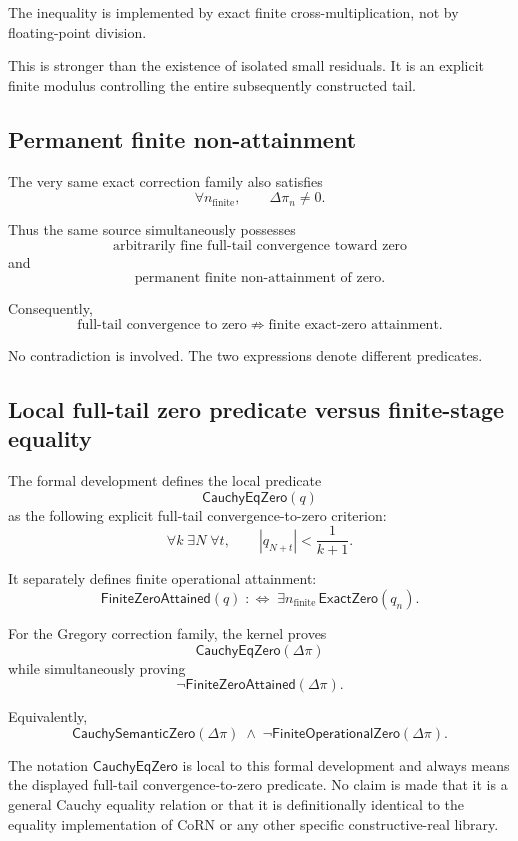\documentclass[11pt,a4paper]{article}
\begin{document}
The inequality is implemented by exact finite cross-multiplication,
not by floating-point division.

This is stronger than the existence of isolated small residuals.  It
is an explicit finite modulus controlling the entire subsequently
constructed tail.

\subsection{Permanent finite non-attainment}

The very same exact correction family also satisfies
\[
\boxed{
\forall n_{\mathrm{finite}},
\qquad
\Delta\pi_n\neq0.
}
\]

Thus the same source simultaneously possesses
\[
\text{arbitrarily fine full-tail convergence toward zero}
\]
and
\[
\text{permanent finite non-attainment of zero}.
\]

Consequently,
\[
\boxed{
\text{full-tail convergence to zero}
\not\Rightarrow
\text{finite exact-zero attainment}.
}
\]

No contradiction is involved.  The two expressions denote different
predicates.

\subsection{Local full-tail zero predicate versus finite-stage equality}

The formal development defines the local predicate
\[
\mathsf{CauchyEqZero}(q)
\]
as the following explicit full-tail convergence-to-zero criterion:
\[
\forall k\;
\exists N\;
\forall t,\qquad
|q_{N+t}|<\frac{1}{k+1}.
\]

It separately defines finite operational attainment:
\[
\mathsf{FiniteZeroAttained}(q)
\;:\Longleftrightarrow\;
\exists n_{\mathrm{finite}}\,
\mathsf{ExactZero}(q_n).
\]

For the Gregory correction family, the kernel proves
\[
\mathsf{CauchyEqZero}(\Delta\pi)
\]
while simultaneously proving
\[
\neg\mathsf{FiniteZeroAttained}(\Delta\pi).
\]

Equivalently,
\[
\boxed{
\mathsf{CauchySemanticZero}(\Delta\pi)
\;\land\;
\neg\mathsf{FiniteOperationalZero}(\Delta\pi).
}
\]

The notation \(\mathsf{CauchyEqZero}\) is local to this formal
development and always means the displayed full-tail
convergence-to-zero predicate. No claim is made that it is a general
Cauchy equality relation or that it is definitionally identical to
the equality implementation of CoRN or any other specific
constructive-real library.
\end{document}
